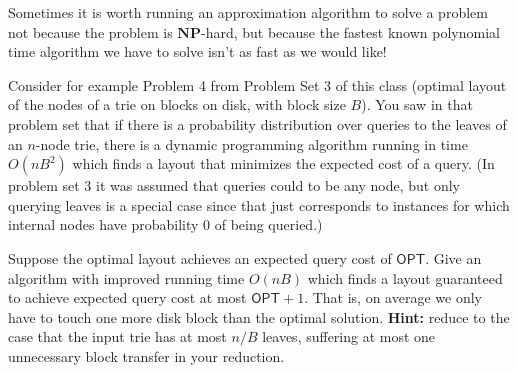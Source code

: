 \documentclass[12pt]{article}
\begin{document}
Sometimes it is worth running an approximation algorithm to solve a problem not because the problem is $\mathbf{NP}$-hard, but because the fastest known polynomial time algorithm we have to solve isn't as fast as we would like!

Consider for example Problem 4 from Problem Set 3 of this class (optimal layout of the nodes of a trie on blocks on disk, with block size $B$). You saw in that problem set that if there is a probability distribution over queries to the leaves of an $n$-node trie, there is a dynamic programming algorithm running in time $O(nB^2)$ which finds a layout that minimizes the expected cost of a query. (In problem set 3 it was assumed that queries could to be any node, but only querying leaves is a special case since that just corresponds to instances for which internal nodes have probability 0 of being queried.)

Suppose the optimal layout achieves an expected query cost of $\mathsf{OPT}$. Give an algorithm with improved running time $O(nB)$ which finds a layout guaranteed to achieve expected query cost at most $\mathsf{OPT} + 1$. That is, on average we only have to touch one more disk block than the optimal solution. \textbf{Hint:} reduce to the case that the input trie has at most $n/B$ leaves, suffering at most one unnecessary block transfer in your reduction.
\end{document}
